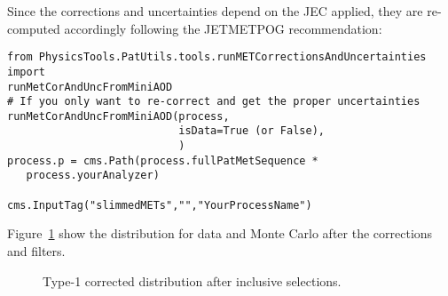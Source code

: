 
Since the \MET corrections and uncertainties depend on the JEC applied, they are re-computed accordingly following the JETMETPOG recommendation:
\begin{verbatim}
from PhysicsTools.PatUtils.tools.runMETCorrectionsAndUncertainties import
runMetCorAndUncFromMiniAOD
# If you only want to re-correct and get the proper uncertainties
runMetCorAndUncFromMiniAOD(process,
                           isData=True (or False),
                           )
process.p = cms.Path(process.fullPatMetSequence *
   process.yourAnalyzer)

cms.InputTag("slimmedMETs","","YourProcessName")
\end{verbatim}

Figure~\ref{fig:type1_met} show the \MET distribution for data and Monte Carlo after the corrections and filters.
 
 \begin{figure}[!htb]
   \centering
   
   \caption{Type-1 corrected \MET distribution after inclusive selections.}
   \label{fig:type1_met}
 \end{figure}


\clearpage

